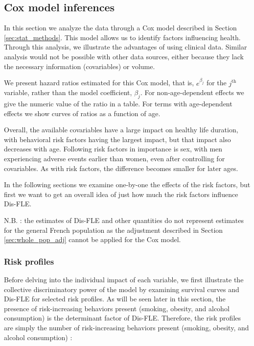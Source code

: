\documentclass{article}
\begin{document}
\hypertarget{cox-model-inferences}{%
\subsection{\texorpdfstring{Cox model inferences
\label{sec:cox}}{Cox model inferences }}\label{cox-model-inferences}}

In this section we analyze the data through a Cox model described in
Section \ref{sec:stat_methods}. This model allows us to identify factors
influencing health. Through this analysis, we illustrate the advantages
of using clinical data. Similar analysis would not be possible with
other data sources, either because they lack the necessary information
(covariables) or volume.

We present hazard ratios estimated for this Cox model, that is,
\(e^{\beta_j}\) for the \(j^\text{th}\) variable, rather than the model
coefficient, \(\beta_j\). For non-age-dependent effects we give the
numeric value of the ratio in a table. For terms with age-dependent
effects we show curves of ratios as a function of age.

Overall, the available covariables have a large impact on healthy life
duration, with behavioral risk factors having the largest impact, but
that impact also decreases with age. Following risk factors in
importance is sex, with men experiencing adverse events earlier than
women, even after controlling for covariables. As with risk factors, the
difference becomes smaller for later ages.

In the following sections we examine one-by-one the effects of the risk
factors, but first we want to get an overall idea of just how much the
risk factors influence Dis-FLE.

N.B. : the estimates of Dis-FLE and other quantities do not represent
estimates for the general French population as the adjustment described
in Section \ref{sec:whole_pop_adj} cannot be applied for the Cox model.

\hypertarget{risk-profiles}{%
\subsubsection{Risk profiles}\label{risk-profiles}}

Before delving into the individual impact of each variable, we first
illustrate the collective discriminatory power of the model by examining
survival curves and Dis-FLE for selected risk profiles. As will be seen
later in this section, the presence of risk-increasing behaviors present
(smoking, obesity, and alcohol consumption) is the determinant factor of
Dis-FLE. Therefore, the risk profiles are simply the number of
risk-increasing behaviors present (smoking, obesity, and alcohol
consumption) :
\end{document}
